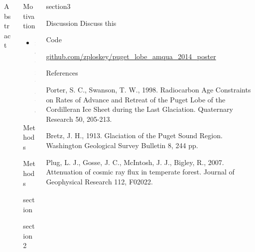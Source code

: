 \documentclass{beamer}
\begin{document}
\begin{frame}{}
\begin{columns}[T]
\begin{column}{0.32\columnwidth}
\begin{block}{Abstract}
\end{block}


\end{column}
	
\begin{column}{.32\columnwidth}
	
\begin{block}{Motivation}

	\begin{itemize}
		\item motivate
	\end{itemize}
	
\end{block}
	
\begin{block}{Methods}

Methods
	
\end{block}

	
\begin{block}{section}
	
\end{block}

\begin{block}{section2}

\end{block}


\end{column}

\begin{column}{.32\columnwidth}



\begin{block}{section3}
		
\end{block}


\begin{block}{Discussion}
	Discuss this
\end{block}

\begin{block}{Code}
	
	\center \url{github.com/zploskey/puget_lobe_amqua_2014_poster} 
	
\end{block}


\begin{block}{References} 
{\small
	Porter, S. C., Swanson, T. W., 1998. Radiocarbon Age Constraints on Rates of Advance and Retreat of the Puget Lobe of the Cordilleran Ice Sheet during the Last Glaciation. Quaternary Research 50, 205-213.

Bretz, J. H., 1913. Glaciation of the Puget Sound Region. Washington Geological Survey Bulletin 8, 244 pp.

Plug, L. J., Gosse, J. C., McIntosh, J. J., Bigley, R., 2007. Attenuation of cosmic ray flux in temperate forest. Journal of Geophysical Research 112, F02022.
	}
\end{block}
	
\end{column}
\end{columns}

\end{frame}
\end{document}
